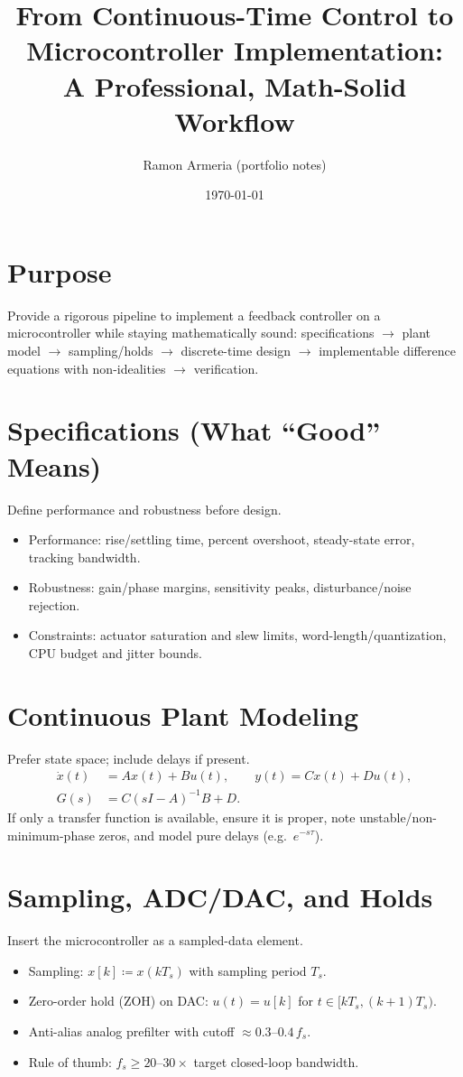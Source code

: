 \documentclass[11pt,a4paper]{article}
\title{From Continuous-Time Control to Microcontroller Implementation:\\
	A Professional, Math-Solid Workflow}
\author{Ramon Armeria (portfolio notes)}
\date{\today}
\begin{document}
	\maketitle
	
	\section*{Purpose}
	Provide a rigorous pipeline to implement a feedback controller on a microcontroller while staying mathematically sound: specifications $\to$ plant model $\to$ sampling/holds $\to$ discrete-time design $\to$ implementable difference equations with non-idealities $\to$ verification.
	
	\section{Specifications (What ``Good'' Means)}
	Define performance and robustness before design.
	\begin{itemize}
		\item Performance: rise/settling time, percent overshoot, steady-state error, tracking bandwidth.
		\item Robustness: gain/phase margins, sensitivity peaks, disturbance/noise rejection.
		\item Constraints: actuator saturation and slew limits, word-length/quantization, CPU budget and jitter bounds.
	\end{itemize}
	
	\section{Continuous Plant Modeling}
	Prefer state space; include delays if present.
	\begin{align*}
		\dot x(t) &= A x(t) + B u(t), \qquad y(t) = C x(t) + D u(t),\\
		G(s) &= C (sI - A)^{-1} B + D.
	\end{align*}
	If only a transfer function is available, ensure it is proper, note unstable/non-minimum-phase zeros, and model pure delays (e.g.\ $e^{-s\tau}$).
	
	\section{Sampling, ADC/DAC, and Holds}
	Insert the microcontroller as a sampled-data element.
	\begin{itemize}
		\item Sampling: $x[k] \coloneqq x(kT_s)$ with sampling period $T_s$.
		\item Zero-order hold (ZOH) on DAC: $u(t) = u[k]$ for $t\in[kT_s,(k{+}1)T_s)$.
		\item Anti-alias analog prefilter with cutoff $\approx 0.3\text{--}0.4\,f_s$.
		\item Rule of thumb: $f_s \ge 20\text{--}30\times$ target closed-loop bandwidth.
	\end{itemize}
	
\end{document}

